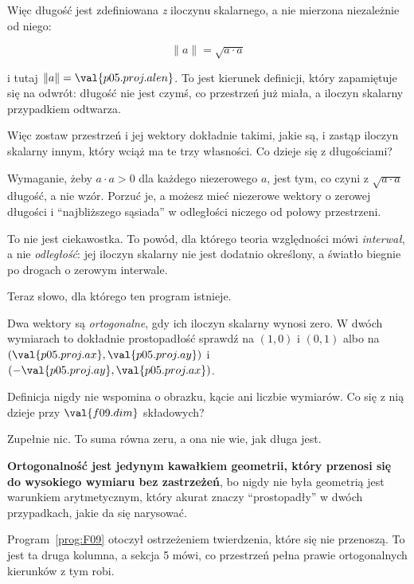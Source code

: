 \begin{fr}
Więc długość jest zdefiniowana \emph{z} iloczynu skalarnego, a nie mierzona
niezależnie od niego:

\[ \lVert a \rVert = \sqrt{a \cdot a} \]

i tutaj $\lVert a \rVert = \val{p05.proj.alen}$. To jest kierunek definicji,
który zapamiętuje się na odwrót: długość nie jest czymś, co przestrzeń już
miała, a iloczyn skalarny przypadkiem odtwarza.

Więc zostaw przestrzeń i jej wektory dokładnie takimi, jakie są, i zastąp
iloczyn skalarny innym, który wciąż ma te trzy własności. Co dzieje się z
długościami?
\dotline
\nextframe
\end{fr}

\begin{fr}
\begin{note}
Wymaganie, żeby $a \cdot a > 0$ dla każdego niezerowego $a$, jest tym, co czyni
z $\sqrt{a \cdot a}$ długość, a nie wzór. Porzuć je, a możesz mieć niezerowe
wektory o zerowej długości i \enquote{najbliższego sąsiada} w odległości niczego
od połowy przestrzeni.

To nie jest ciekawostka. To powód, dla którego teoria względności mówi
\emph{interwał}, a nie \emph{odległość}: jej iloczyn skalarny nie jest dodatnio
określony, a światło biegnie po drogach o zerowym interwale.
\end{note}
\end{fr}

\begin{fr}
Teraz słowo, dla którego ten program istnieje.

Dwa wektory są \emph{ortogonalne}, gdy ich iloczyn skalarny wynosi zero. W
dwóch wymiarach to dokładnie prostopadłość \dash{} sprawdź na $(1, 0)$ i
$(0, 1)$ albo na $(\val{p05.proj.ax}, \val{p05.proj.ay})$ i
$(-\val{p05.proj.ay}, \val{p05.proj.ax})$.

Definicja nigdy nie wspomina o obrazku, kącie ani liczbie wymiarów. Co się
z nią dzieje przy $\val{f09.dim}$ składowych?
\nextframe
\end{fr}

\begin{fr}
\begin{ansblock}
Zupełnie nic. To suma równa zeru, a ona nie wie, jak długa jest.
\end{ansblock}

\textbf{Ortogonalność jest jedynym kawałkiem geometrii, który przenosi się do
wysokiego wymiaru bez zastrzeżeń}, bo nigdy nie była geometrią \dash{} jest
warunkiem arytmetycznym, który akurat znaczy \enquote{prostopadły} w dwóch
przypadkach, jakie da się narysować.

Program~\ref{prog:F09} otoczył ostrzeżeniem twierdzenia, które się nie
przenoszą. To jest ta druga kolumna, a sekcja 5 mówi, co przestrzeń pełna
prawie ortogonalnych kierunków z tym robi.
\end{fr}

